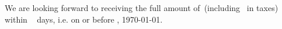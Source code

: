 \documentclass[	backaddress=off,
				paper=letter,
				fontsize=11pt,
				parskip=full]{scrlttr2}
\begin{document}
\begin{letter}
{%
	\def\par{\relax\ifhmode\unskip\fi\space\ignorespaces} 

We are looking forward to receiving the full amount of\Total\ (including%
\TaxAmnt\ in taxes) within \numberstringnum{\payperiod}\ %
 days{}, i.e. on or before \DayName{\year}{\month}{\day+\payperiod},
 \AdvanceDate[\payperiod]\today{}. 

}

		\AdvanceDate[-\payperiod]				%
		\enlargethispage{4\baselineskip}


\closing{}					%

	\end{letter}
\end{document}
